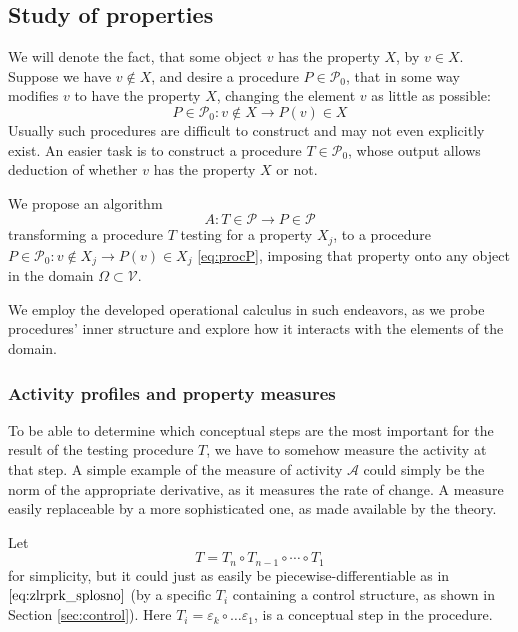 \documentclass[smallcondensed]{svjour3}
\newcommand{\VV}{\mathcal{V}}
\newcommand{\dP}{\mathcal{P}}
\begin{document}
  \subsection{Study of properties}\label{sec:studyProperties}
  
  We will denote the fact, that some object $v$ has the property $X$, by $v\in
  X$. Suppose we have $v\notin X$, and desire a procedure $P\in\dP_0$, that in
  some way modifies $v$ to have the property $X$, changing the element $v$ as
  little as possible: 
  \begin{equation}\label{eq:procP}
  P\in \dP_0:v\notin X\to P(v)\in X
  \end{equation}
  Usually such procedures are difficult to construct and may not even explicitly
  exist. An easier task is to construct a procedure $T\in\dP_0$, whose output
  allows deduction of whether $v$ has the property $X$ or not. 
  
   We propose an algorithm
   \begin{equation}\label{eq:algA}
     A:T\in\dP\to P\in\dP
     \end{equation}
     transforming a procedure $T$ testing for a property $X_j$, to a procedure
     $P\in \dP_0:v\notin X_j\to P(v)\in X_j$ \eqref{eq:procP}, imposing that
     property onto any object in the domain $\Omega\subset \VV$.
   
   We employ the developed operational calculus in such endeavors, as we probe
   procedures' inner structure and explore how it interacts with the elements of
   the domain.
 
\subsubsection{Activity profiles and property measures}\label{sec:propertyMeasure}
    
To be able to determine which conceptual steps are the most important for the
result of the testing procedure $T$, we have to somehow measure the activity
at that step. A simple example of the measure of activity $\mathcal{A}$ could simply be the norm of the
appropriate derivative, as it measures the rate of change. A measure easily replaceable by a more sophisticated one, as made available by the theory.

   Let 
   $$T=T_n\circ T_{n-1}\circ\cdots\circ T_1$$
   for simplicity, but it could just as easily be piecewise-differentiable as in $\eqref{eq:zlrprk_splosno}$ (by a specific $T_i$ containing a control structure, as shown in Section \ref{sec:control}). Here $T_i=\varepsilon_k\circ\ldots \varepsilon_1$, is a conceptual step in the procedure.
  
\end{document}
